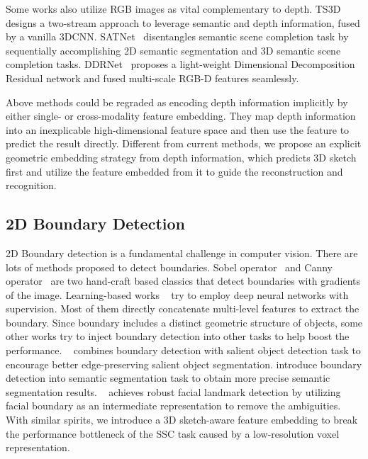 \documentclass[10pt,twocolumn,letterpaper]{article}
\begin{document}
Some works also utilize RGB images as vital complementary to depth. TS3D~\cite{garbade2018two-ts3d} designs a two-stream approach to leverage semantic and depth information, fused by a vanilla 3DCNN. SATNet~\cite{liu2018see-satnet} disentangles semantic scene completion task by sequentially accomplishing 2D semantic segmentation and 3D semantic scene completion tasks. DDRNet~\cite{li2019rgbd-ddrnet} proposes a light-weight Dimensional Decomposition Residual network and fused multi-scale RGB-D features seamlessly.

 Above methods could be regraded as encoding depth information implicitly by either single- or cross-modality feature embedding. They map depth information into an inexplicable high-dimensional feature space and then use the feature to predict the result directly. Different from current methods, we propose an explicit geometric embedding strategy from depth information, which predicts 3D sketch first and utilize the feature embedded from it to guide the reconstruction and recognition.

\subsection{2D Boundary Detection}
2D Boundary detection is a fundamental challenge in computer vision. There are lots of methods proposed to detect boundaries. Sobel operator~\cite{sobel1968operator} and Canny operator~\cite{canny1986computational} are two hand-craft based classics that detect boundaries with gradients of the image. Learning-based works ~\cite{liu2017richer,he2019bi,yang2016object} try to employ deep neural networks with supervision. Most of them directly concatenate multi-level features to extract the boundary. Since boundary includes a distinct geometric structure of objects, some other works try to inject boundary detection into other tasks to help boost the performance. ~\cite{wang2019salient} combines boundary detection with salient object detection task to encourage better edge-preserving salient object segmentation. \cite{yu2018learning,takikawa2019gated} introduce boundary detection into semantic segmentation task to obtain more precise semantic segmentation results. ~\cite{wayne2018lab} achieves robust facial landmark detection by utilizing facial boundary as an intermediate representation to remove the ambiguities. With similar spirits, we introduce a 3D sketch-aware feature embedding to break the performance bottleneck of the SSC task caused by a low-resolution voxel representation.
\end{document}
